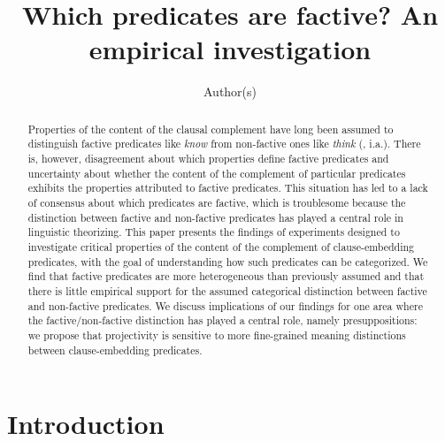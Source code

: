 \documentclass[11pt,fleqn]{article}
\title{Which predicates are factive? An empirical investigation}
\author{Author(s)}
\newcommand{\6}{\mbox{$[\hspace*{-.6mm}[$}}
\newcommand{\9}{\mbox{$]\hspace*{-.6mm}]$}}
\begin{document}

\maketitle

\vspace*{-1cm}

\begin{abstract}

Properties of the content of the clausal complement have long been assumed to distinguish factive predicates like {\em know} from non-factive ones like {\em think} (\citealt{kiparsky-kiparsky70}, i.a.). There is, however, disagreement  about which properties define factive predicates and uncertainty about whether the content of the complement of particular predicates exhibits the properties attributed to factive predicates. This situation has led to a lack of consensus about which predicates are factive, which is troublesome because the distinction between factive and non-factive predicates has played a central role in linguistic theorizing. This paper presents the findings of experiments designed to investigate critical properties of the content of the complement of clause-embedding predicates, with the goal of understanding how such predicates can be categorized. We find that factive predicates are more heterogeneous than previously assumed and that there is little empirical support for the assumed categorical distinction between factive and non-factive predicates. We discuss implications of our findings for one area where the factive/non-factive distinction has played a central role, namely presuppositions: we propose that projectivity is sensitive to more fine-grained meaning distinctions between clause-embedding predicates.

\end{abstract}

			
\section{Introduction}\label{s1}
\end{document}
